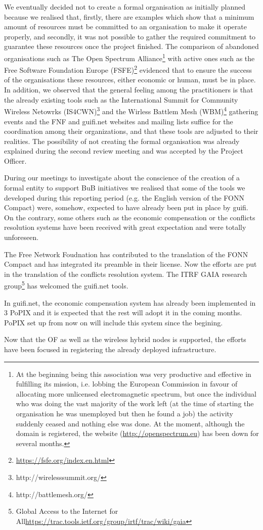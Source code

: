 We eventually decided not to create a formal organisation as initially planned because we realised that, firstly, there are examples which show that a minimum amount of resources must be committed to an organisation to make it operate properly, and secondly, it was not possible to gather the required commitment to guarantee these resources once the project finished. The comparison of abandoned organisations such as The Open Spectrum Alliance\footnote{At the beginning being this association was very productive and effective in fulfilling its mission, i.e. lobbing the European Commission in favour of allocating more unlicensed electromagnetic spectrum, but once the individual who was doing the vast majority of the work left (at the time of starting the organisation he was unemployed but then he found a job) the activity suddenly ceased and nothing else was done. At the moment, although the domain is registered, the website (\url{http://openspectrum.eu}) has been down for several months.} with active ones such as the Free Software Foundation Europe (FSFE)\footnote{\url{https://fsfe.org/index.en.html}} evidenced that to ensure the success of the organisations these resources, either economic or human, must be in place. In addition, we observed that the general feeling among the practitioners is that the already existing tools such as the International Summit for Community Wireless Netowrks (IS4CWN)\footnote{http://wirelesssummit.org/} and the Wirless Battlem Mesh (WBM)\footnote{http://battlemesh.org/} gathering events and the FNF and guifi.net websites and mailing lists suffice for the coordination among their organizations, and that these tools are adjusted to their realities. The possibility of not creating the formal organisation was already explained during the second review meeting and was accepted by the Project Officer.

During our meetings to investigate about the conscience of the creation of a formal entity to support BuB initiatives we realised that some of the tools we developed during this reporting period (e.g. the English version of the FONN Compact) were, somehow, expected to have already been put in place by guifi. On the contrary, some others such as the economic compensation or the conflicts resolution systems have been received with great expectation and were totally unforeseen.

The Free Network Foudnation has contributed to the translation of the FONN Compact and has integrated its preamble in their license. Now the efforts are put in the translation of the conflicts resolution system. The ITRF GAIA research group\footnote{Global Access to the Internet for All\url{https://trac.tools.ietf.org/group/irtf/trac/wiki/gaia}} has welcomed the guifi.net tools.

In guifi.net, the economic compensation system has already been implemented in 3 PoPIX and it is expected that the rest will adopt it in the coming months. PoPIX set up from now on will include this system since the begining.

Now that the OF as well as the wireless hybrid nodes is supported, the efforts have been focused in registering the already deployed infrastructure.

